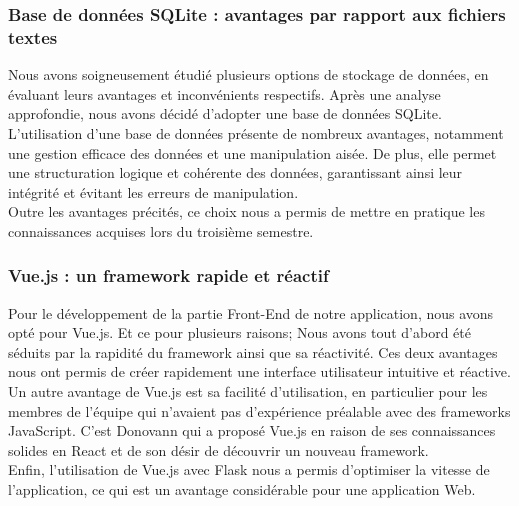 \vspace{2mm}
\subsubsection{Base de données SQLite : avantages par rapport aux fichiers textes}
Nous avons soigneusement étudié plusieurs options de stockage de données, en évaluant leurs avantages et inconvénients respectifs. Après une analyse approfondie, nous avons décidé d'adopter une base de données SQLite.\\

L'utilisation d'une base de données présente de nombreux avantages, notamment une gestion efficace des données et une manipulation aisée. De plus, elle permet une structuration logique et cohérente des données, garantissant ainsi leur intégrité et évitant les erreurs de manipulation.\\

Outre les avantages précités, ce choix nous a permis de mettre en pratique les connaissances acquises lors du troisième semestre.

\vspace{2mm}
\subsubsection{Vue.js : un framework rapide et réactif}
Pour le développement de la partie Front-End de notre application, nous avons opté pour Vue.js. Et ce pour plusieurs raisons;
Nous avons tout d'abord été séduits par la rapidité du framework ainsi que sa réactivité. Ces deux avantages nous ont permis de créer rapidement une interface utilisateur intuitive et réactive.\\

Un autre avantage de Vue.js est sa facilité d'utilisation, en particulier pour les membres de l'équipe qui n'avaient pas d'expérience préalable avec des frameworks JavaScript. C'est Donovann qui a proposé Vue.js en raison de ses connaissances solides en React et de son désir de découvrir un nouveau framework.\\

Enfin, l'utilisation de Vue.js avec Flask nous a permis d'optimiser la vitesse de l'application, ce qui est un avantage considérable pour une application Web.